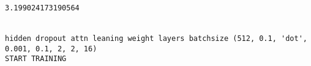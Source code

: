 \documentclass[11pt]{article}
\begin{document}
    \begin{center}
    \end{center}
    { \hspace*{\fill} \\}
    
    \begin{center}
    \end{center}
    { \hspace*{\fill} \\}
    
    \begin{Verbatim}[commandchars=\\\{\}]
3.199024173190564


hidden dropout attn leaning weight layers batchsize (512, 0.1, 'dot', 0.001, 0.1, 2, 2, 16)
START TRAINING



    \end{Verbatim}

    \begin{center}
    \end{center}
    { \hspace*{\fill} \\}
    
    \begin{center}
    \end{center}
    { \hspace*{\fill} \\}
    
    \begin{center}
    \end{center}
    { \hspace*{\fill} \\}
    
    \begin{center}
    \end{center}
    { \hspace*{\fill} \\}
    
    \begin{center}
    \end{center}
    { \hspace*{\fill} \\}
    
\end{document}

